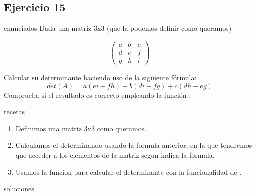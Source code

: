 \subsection{Ejercicio 15}
\def\parte{enunciados}
\ifx\capitulo\parte
Dada una matriz 3x3 (que la podemos definir como queramos)

\[
  \begin{pmatrix}
    a & b & c\\
    d & e & f\\
    g & h & i
  \end{pmatrix}
\]

Calcular su determinante haciendo uso de la siguiente fórmula:
\[det(A) = a(ei-fh)-b(di-fg)+c(dh-eg) \]
Comprueba si el resultado es correcto empleando la función .
\fi

\def\parte{recetas}
\ifx\capitulo\parte
\begin{enumerate}
\item Definimos una matriz 3x3 como queramos.
\item Calculamos el determinando usando la formula anterior, en la que tendremos que acceder a los elementos de la matriz segun indica la formula.
\item Usamos la funcion  para calcular el determinante con la funcionalidad de \mt.
\end{enumerate}
\fi

\def\parte{soluciones}
\ifx\capitulo\parte

\fi
